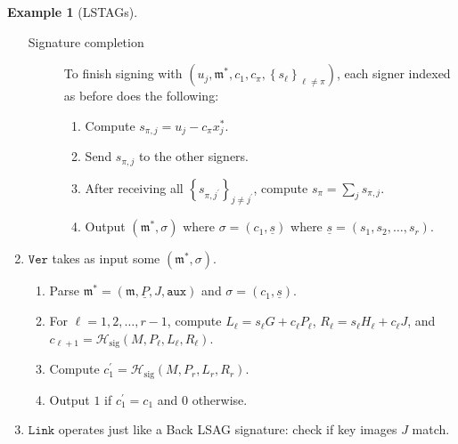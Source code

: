 \documentclass{mrl}
\theoremstyle{definition}
\numberwithin{theorem}{subsection}
\newtheorem{ex}[theorem]{Example}
\newcommand{\m}{\mathfrak{m}}
\begin{document}
\begin{ex}[LSTAGs]
\begin{enumerate}
\begin{description}
\item [Signature completion] To finish signing with $(u_j, \m^*, c_1, c_\pi, \left\{s_{\ell}\right\}_{\ell \neq \pi})$, each signer indexed as before does the following:
\begin{enumerate}
\item Compute $s_{\pi, j} = u_j - c_\pi x^*_j$.
\item Send $s_{\pi, j}$ to the other signers.%
\item After receiving all $\left\{s_{\pi, j^\prime}\right\}_{j \neq j^\prime}$, compute $s_\pi = \sum_j s_{\pi,j}$.
\item Output $(\m^*, \sigma)$ where $\sigma = (c_1, \underline{s})$ where $\underline{s} = (s_1, s_2, \ldots, s_r)$.
\end{enumerate}
\end{description}

\item $\texttt{Ver}$ takes as input some $(\mathfrak{m}^*, \sigma)$.
\begin{enumerate}
\item Parse $\mathfrak{m}^* = (\mathfrak{m}, \underline{P}, J, \texttt{aux})$ and $\sigma = (c_1, \underline{s})$.
\item For $\ell = 1, 2, \ldots, r-1$, compute $L_\ell = s_\ell G + c_\ell P_\ell$, $R_\ell = s_\ell H_\ell + c_\ell J$, and $c_{\ell+1} = \mathcal{H}_{\text{sig}}(M, P_\ell, L_\ell, R_\ell)$. 
\item Compute $c_1^\prime = \mathcal{H}_{\text{sig}}(M, P_r, L_r, R_r)$.
\item Output $1$ if $c_1^\prime = c_1$ and $0$ otherwise.
\end{enumerate}

\item $\texttt{Link}$ operates just like a Back LSAG signature: check if key images $J$ match.
\end{enumerate}

\end{ex}

\end{document}
